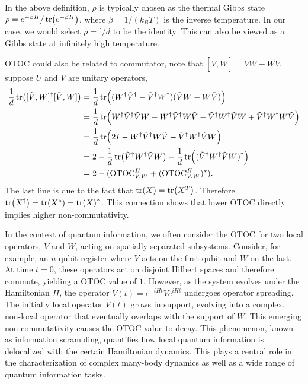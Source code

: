 \documentclass[onecolumn,prx,longbibliography,nofootinbib, superscriptaddress]{revtex4-2}
\theoremstyle{recap}
\begin{document}
In the above definition, $\rho$ is typically chosen as the thermal Gibbs state $\rho = e^{-\beta H} / \tr(e^{-\beta H})$, where $\beta = 1/(k_B T)$ is the inverse temperature. In our case, we would select $\rho=\mathbb{I}/d$ to be the identity. This can also be viewed as a Gibbs state at infinitely high temperature. 

OTOC could also be related to commutator, note that $[\tilde{V},W]=\tilde{V}W-W\tilde{V}$, suppose $U$ and $V$ are unitary operators,
\begin{equation}
\begin{split}
    \frac{1}{d}\tr([\tilde{V},W]^{\dagger}[\tilde{V},W])&=\frac{1}{d}\tr\Bigl((W^{\dagger}\tilde{V}^{\dagger}-\tilde{V}^{\dagger}W^{\dagger})(\tilde{V}W-W\tilde{V})\Bigr)\\
    &=\frac{1}{d}\tr\Bigl(W^{\dagger}\tilde{V}^{\dagger}\tilde{V}W-W^{\dagger}\tilde{V}^{\dagger}W\tilde{V}-\tilde{V}^{\dagger}W^{\dagger}\tilde{V}W+\tilde{V}^{\dagger}W^{\dagger}W\tilde{V}\Bigr)\\
    &=\frac{1}{d}\tr\Bigl(2I-W^{\dagger}\tilde{V}^{\dagger}W\tilde{V}-\tilde{V}^{\dagger}W^{\dagger}\tilde{V}W\Bigr)\\
    &=2-\frac{1}{d}\tr(\tilde{V}^{\dagger}W^{\dagger}\tilde{V}W)-\frac{1}{d}\tr\Bigl((\tilde{V}^{\dagger}W^{\dagger}\tilde{V}W)^{\dagger}\Bigr)\\
    &=2-(\mathrm{OTOC}_{V,W}^{H}+(\mathrm{OTOC}_{V,W}^{H})^{*}).
\end{split}
\end{equation}
The last line is due to the fact that $\tr(X)=\tr(X^{T})$. Therefore $\tr(X^{\dagger})=\tr(X^{*})=\tr(X)^{*}$. This connection shows that lower OTOC directly implies higher non-commutativity. 

In the context of quantum information, we often consider the OTOC for two local operators, $V$ and $W$, acting on spatially separated subsystems. Consider, for example, an $n$-qubit register where $V$ acts on the first qubit and $W$ on the last. At time $t=0$, these operators act on disjoint Hilbert spaces and therefore commute, yielding a OTOC value of $1$. However, as the system evolves under the Hamiltonian $H$, the operator $\tilde{V}(t) = e^{-iHt} V e^{iHt}$ undergoes operator spreading. The initially local operator $\tilde{V}(t)$ grows in support, evolving into a complex, non-local operator that eventually overlaps with the support of $W$. This emerging non-commutativity causes the OTOC value to decay. This phenomenon, known as information scrambling, quantifies how local quantum information is delocalized with the certain Hamiltonian dynamics. This plays a central role in the characterization of complex many-body dynamics as well as a wide range of quantum information tasks. 
\end{document}
